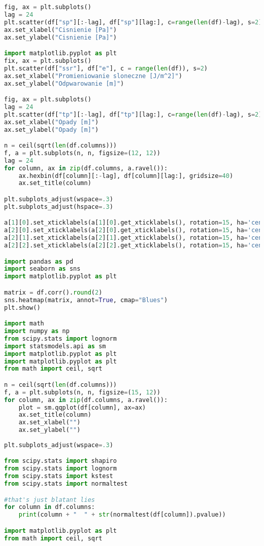 \begin{lstlisting}[label=python-listing,caption={Kod źródłowy},language=python]
fig, ax = plt.subplots()
lag = 24
plt.scatter(df["sp"][:-lag], df["sp"][lag:], c=range(len(df)-lag), s=2)
ax.set_xlabel("Cisnienie [Pa]")
ax.set_ylabel("Cisnienie [Pa]")

import matplotlib.pyplot as plt
fix, ax = plt.subplots()
plt.scatter(df["ssr"], df["e"], c = range(len(df)), s=2)
ax.set_xlabel("Promieniowanie sloneczne [J/m^2]")
ax.set_ylabel("Odpwarowanie [m]")

fig, ax = plt.subplots()
lag = 24
plt.scatter(df["tp"][:-lag], df["tp"][lag:], c=range(len(df)-lag), s=2)
ax.set_xlabel("Opady [m]")
ax.set_ylabel("Opady [m]")

n = ceil(sqrt(len(df.columns)))
f, a = plt.subplots(n, n, figsize=(12, 12))
lag = 24
for column, ax in zip(df.columns, a.ravel()):
    ax.hexbin(df[column][:-lag], df[column][lag:], gridsize=40)
    ax.set_title(column)

plt.subplots_adjust(wspace=.3)
plt.subplots_adjust(hspace=.3)

a[1][0].set_xticklabels(a[1][0].get_xticklabels(), rotation=15, ha='center')
a[2][0].set_xticklabels(a[2][0].get_xticklabels(), rotation=15, ha='center')
a[2][1].set_xticklabels(a[2][1].get_xticklabels(), rotation=15, ha='center')
a[2][2].set_xticklabels(a[2][2].get_xticklabels(), rotation=15, ha='center')

import pandas as pd
import seaborn as sns
import matplotlib.pyplot as plt

matrix = df.corr().round(2)
sns.heatmap(matrix, annot=True, cmap="Blues")
plt.show()

import math
import numpy as np
from scipy.stats import lognorm
import statsmodels.api as sm
import matplotlib.pyplot as plt
import matplotlib.pyplot as plt
from math import ceil, sqrt

n = ceil(sqrt(len(df.columns)))
f, a = plt.subplots(n, n, figsize=(15, 12))
for column, ax in zip(df.columns, a.ravel()):
    plot = sm.qqplot(df[column], ax=ax)
    ax.set_title(column)
    ax.set_xlabel("")
    ax.set_ylabel("")
    
plt.subplots_adjust(wspace=.3)

from scipy.stats import shapiro 
from scipy.stats import lognorm
from scipy.stats import kstest
from scipy.stats import normaltest

#that's just blatant lies
for column in df.columns:
    print(column + "  " + str(normaltest(df[column]).pvalue))

import matplotlib.pyplot as plt
from math import ceil, sqrt


\end{lstlisting}
